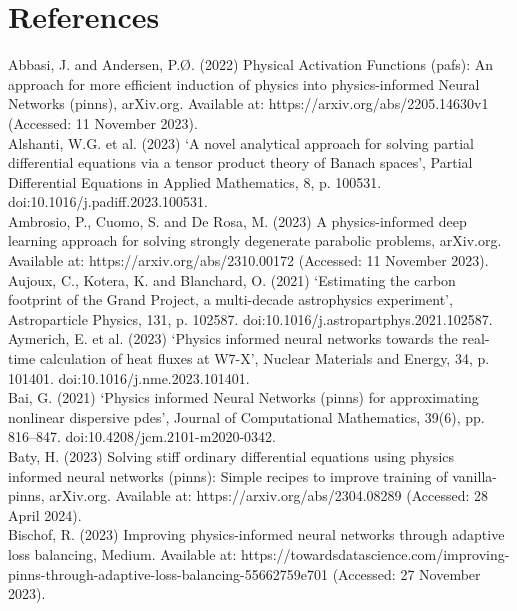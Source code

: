 \documentclass[12pt, openany]{book}
\begin{document}

\chapter{References}

Abbasi, J. and Andersen, P.Ø. (2022) Physical Activation Functions (pafs): An approach for more efficient induction of physics into physics-informed Neural Networks (pinns), arXiv.org. Available at: https://arxiv.org/abs/2205.14630v1 (Accessed: 11 November 2023). \\

Alshanti, W.G. et al. (2023) ‘A novel analytical approach for solving partial differential equations via a tensor product theory of Banach spaces’, Partial Differential Equations in Applied Mathematics, 8, p. 100531. doi:10.1016/j.padiff.2023.100531. \\

Ambrosio, P., Cuomo, S. and De Rosa, M. (2023) A physics-informed deep learning approach for solving strongly degenerate parabolic problems, arXiv.org. Available at: https://arxiv.org/abs/2310.00172 (Accessed: 11 November 2023). \\

Aujoux, C., Kotera, K. and Blanchard, O. (2021) ‘Estimating the carbon footprint of the Grand Project, a multi-decade astrophysics experiment’, Astroparticle Physics, 131, p. 102587. doi:10.1016/j.astropartphys.2021.102587. \\

Aymerich, E. et al. (2023) ‘Physics informed neural networks towards the real-time calculation of heat fluxes at W7-X’, Nuclear Materials and Energy, 34, p. 101401. doi:10.1016/j.nme.2023.101401. \\

Bai, G. (2021) ‘Physics informed Neural Networks (pinns) for approximating nonlinear dispersive pdes’, Journal of Computational Mathematics, 39(6), pp. 816–847. doi:10.4208/jcm.2101-m2020-0342. \\

Baty, H. (2023) Solving stiff ordinary differential equations using physics informed neural networks (pinns): Simple recipes to improve training of vanilla-pinns, arXiv.org. Available at: https://arxiv.org/abs/2304.08289 (Accessed: 28 April 2024). \\

Bischof, R. (2023) Improving physics-informed neural networks through adaptive loss balancing, Medium. Available at: https://towardsdatascience.com/improving-pinns-through-adaptive-loss-balancing-55662759e701 (Accessed: 27 November 2023). \\
\end{document}
